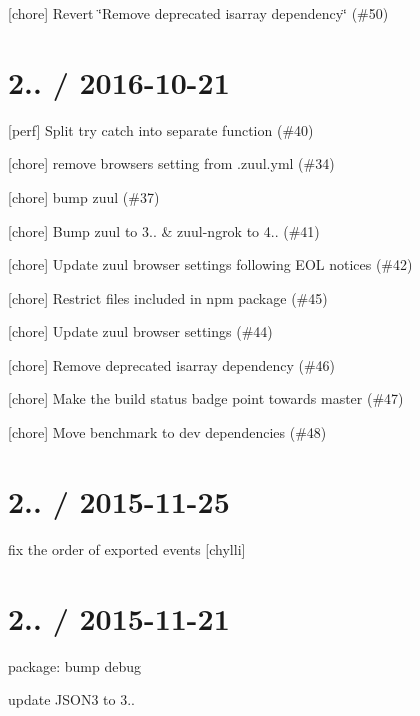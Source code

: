 
\begin{DoxyItemize}
\item \mbox{[}chore\mbox{]} Revert \char`\"{}\+Remove deprecated isarray dependency\char`\"{} (\#50)
\end{DoxyItemize}

\section*{2.. / 2016-\/10-\/21 }


\begin{DoxyItemize}
\item \mbox{[}perf\mbox{]} Split try catch into separate function (\#40)
\item \mbox{[}chore\mbox{]} remove browsers setting from .zuul.\+yml (\#34)
\item \mbox{[}chore\mbox{]} bump zuul (\#37)
\item \mbox{[}chore\mbox{]} Bump zuul to 3.. \& zuul-\/ngrok to 4.. (\#41)
\item \mbox{[}chore\mbox{]} Update zuul browser settings following E\+OL notices (\#42)
\item \mbox{[}chore\mbox{]} Restrict files included in npm package (\#45)
\item \mbox{[}chore\mbox{]} Update zuul browser settings (\#44)
\item \mbox{[}chore\mbox{]} Remove deprecated isarray dependency (\#46)
\item \mbox{[}chore\mbox{]} Make the build status badge point towards master (\#47)
\item \mbox{[}chore\mbox{]} Move benchmark to dev dependencies (\#48)
\end{DoxyItemize}

\section*{2.. / 2015-\/11-\/25 }


\begin{DoxyItemize}
\item fix the order of exported events \mbox{[}chylli\mbox{]}
\end{DoxyItemize}

\section*{2.. / 2015-\/11-\/21 }


\begin{DoxyItemize}
\item package\+: bump debug
\item update J\+S\+O\+N3 to 3..
\end{DoxyItemize}

